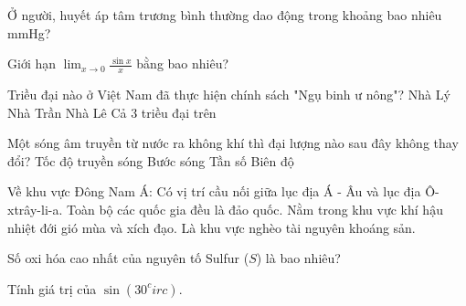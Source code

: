 \begin{ex}
    Ở người, huyết áp tâm trương bình thường dao động trong khoảng bao nhiêu mmHg?
\end{ex}

\begin{ex}
    Giới hạn $\lim_{x \to 0} \frac{\sin x}{x}$ bằng bao nhiêu?
\end{ex}

\begin{ex}
    Triều đại nào ở Việt Nam đã thực hiện chính sách "Ngụ binh ư nông"?
    \choice
    {Nhà Lý}
    {Nhà Trần}
    {Nhà Lê}
    {\True Cả 3 triều đại trên}
\end{ex}

\begin{ex}
    Một sóng âm truyền từ nước ra không khí thì đại lượng nào sau đây không thay đổi?
    \choice
    {Tốc độ truyền sóng}
    {Bước sóng}
    {\True Tần số}
    {Biên độ}
\end{ex}

\begin{ex}
    Về khu vực Đông Nam Á:
    \choiceTF
    {\True Có vị trí cầu nối giữa lục địa Á - Âu và lục địa Ô-xtrây-li-a.}
    {Toàn bộ các quốc gia đều là đảo quốc.}
    {\True Nằm trong khu vực khí hậu nhiệt đới gió mùa và xích đạo.}
    {Là khu vực nghèo tài nguyên khoáng sản.}
\end{ex}

\begin{ex}
    Số oxi hóa cao nhất của nguyên tố Sulfur ($S$) là bao nhiêu?
\end{ex}

\begin{ex}
    Tính giá trị của $\sin(30^circ)$.
\end{ex}

